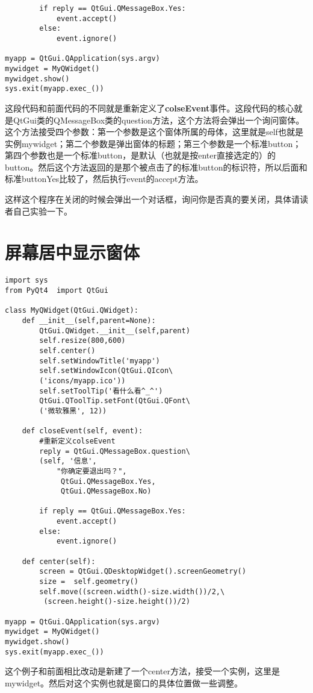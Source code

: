 \documentclass[12pt,oneside]{book}
\begin{document}
\begin{common-format}
\begin{Verbatim}
        if reply == QtGui.QMessageBox.Yes:
            event.accept()
        else:
            event.ignore()

myapp = QtGui.QApplication(sys.argv)
mywidget = MyQWidget()
mywidget.show()
sys.exit(myapp.exec_())
\end{Verbatim}

这段代码和前面代码的不同就是重新定义了\textbf{colseEvent}事件。这段代码的核心就是QtGui类的QMessageBox类的question方法，这个方法将会弹出一个询问窗体。这个方法接受四个参数：第一个参数是这个窗体所属的母体，这里就是self也就是实例mywidget；第二个参数是弹出窗体的标题；第三个参数是一个标准button；第四个参数也是一个标准button，是默认（也就是按enter直接选定的）的button。然后这个方法返回的是那个被点击了的标准button的标识符，所以后面和标准buttonYes比较了，然后执行event的accept方法。

这样这个程序在关闭的时候会弹出一个对话框，询问你是否真的要关闭，具体请读者自己实验一下。

\section{屏幕居中显示窗体}
\begin{Verbatim}
import sys
from PyQt4  import QtGui

class MyQWidget(QtGui.QWidget):
    def __init__(self,parent=None):
        QtGui.QWidget.__init__(self,parent)
        self.resize(800,600)
        self.center()
        self.setWindowTitle('myapp')
        self.setWindowIcon(QtGui.QIcon\
        ('icons/myapp.ico'))
        self.setToolTip('看什么看^_^')
        QtGui.QToolTip.setFont(QtGui.QFont\
        ('微软雅黑', 12))

    def closeEvent(self, event):
        #重新定义colseEvent
        reply = QtGui.QMessageBox.question\
        (self, '信息',
            "你确定要退出吗？",
             QtGui.QMessageBox.Yes,
             QtGui.QMessageBox.No)

        if reply == QtGui.QMessageBox.Yes:
            event.accept()
        else:
            event.ignore()
            
    def center(self):
        screen = QtGui.QDesktopWidget().screenGeometry()
        size =  self.geometry()
        self.move((screen.width()-size.width())/2,\
         (screen.height()-size.height())/2)

myapp = QtGui.QApplication(sys.argv)
mywidget = MyQWidget()
mywidget.show()
sys.exit(myapp.exec_())
\end{Verbatim}
这个例子和前面相比改动是新建了一个center方法，接受一个实例，这里是mywidget。然后对这个实例也就是窗口的具体位置做一些调整。


\end{common-format}
\end{document}
